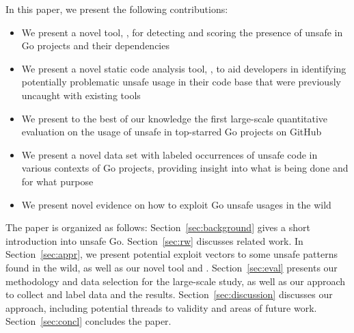 In this paper, we present the following contributions:

\begin{itemize}
\item We present a novel tool, \toolUsage{}, for detecting and scoring the presence of unsafe in Go projects and their dependencies
\item We present a novel static code analysis tool, \toolSA{}, to aid developers in identifying potentially problematic unsafe usage in their code base that were previously uncaught with existing tools
\item We present to the best of our knowledge the first large-scale quantitative evaluation on the usage of unsafe in \projsAnalyzed{} top-starred Go projects on GitHub
\item We present a novel data set with  labeled occurrences of unsafe code in various contexts of Go projects, providing insight into what is being done and for what purpose
\item We present novel evidence on how to exploit Go unsafe usages in the wild
\end{itemize}

The paper is organized as follows:
Section~\ref{sec:background} gives a short introduction into unsafe Go.
Section~\ref{sec:rw} discusses related work. 
In Section~\ref{sec:appr}, we present potential exploit vectors to some unsafe patterns found in the wild, as well as our novel tool \toolUsage{} and \toolSA{}. Section~\ref{sec:eval} presents our methodology and data selection for the large-scale study, as well as our approach to collect and label data and the results.
Section~\ref{sec:discussion} discusses our approach, including potential threads to validity and areas of future work.
Section~\ref{sec:concl} concludes the paper.
